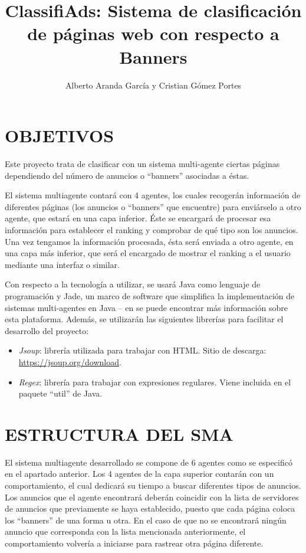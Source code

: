 \documentclass{pre-tfg}
\title{ClassifiAds: Sistema de clasificación de páginas web con respecto a Banners}
\author{Alberto Aranda García y Cristian Gómez Portes}
\begin{document}
\maketitle
\tableofcontents

\newpage

\section{OBJETIVOS}

Este proyecto trata de clasificar con un sistema multi-agente ciertas páginas dependiendo del número de anuncios o ``banners'' asociadas a éstas.

El sistema multiagente contará con 4 agentes, los cuales recogerán información de diferentes páginas (los anuncios o ``banners'' que encuentre) para enviárselo a otro agente, que estará en una capa inferior. Éste se encargará de procesar esa información para establecer el ranking y comprobar de qué tipo son los anuncios. Una vez tengamos la información procesada, ésta será enviada a otro agente, en una capa más inferior, que será el encargado de mostrar el ranking a el usuario mediante una interfaz o similar.

Con respecto a la tecnología a utilizar, se usará Java como lenguaje de programación y Jade, un marco de software que simplifica la implementación de sistemas multi-agentes en Java -- en \cite{bellifemine2002jade} se puede encontrar más información sobre esta plataforma. Además, se utilizarán las siguientes librerías para facilitar el desarrollo del proyecto:

\begin{itemize}
 \item \textit{Jsoup}: librería utilizada para trabajar con HTML. Sitio de descarga: \url{https://jsoup.org/download}.
\item  \textit{Regex}: librería para trabajar con expresiones regulares. Viene incluida en el paquete ``util'' de Java.
\end{itemize}

\section{ESTRUCTURA DEL SMA}
El sistema multiagente desarrollado se compone de 6 agentes como se especificó en el apartado anterior. Los 4 agentes de la capa superior contarán con un comportamiento, el cual dedicará su tiempo a buscar diferentes tipos de anuncios. Los anuncios que el agente encontrará deberán coincidir con la lista de servidores de anuncios que previamente se haya establecido, puesto que cada página coloca los ``banners'' de una forma u otra. En el caso de que no se encontrará ningún anuncio que corresponda con la lista mencionada anteriormente, el comportamiento volvería a iniciarse para rastrear otra página diferente.
\end{document}
